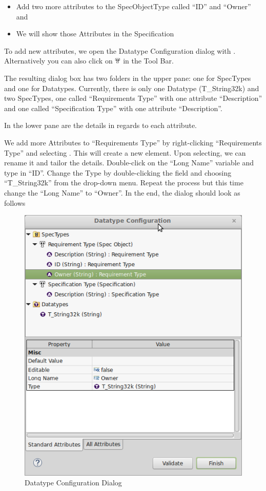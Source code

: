 \begin{itemize}
\item
  Add two more attributes to the SpecObjectType called ``ID'' and ``Owner'' and
\item
  We will show those Attributes in the Specification
\end{itemize}

To add new attributes, we open the Datatype Configuration dialog with .  Alternatively you can also click on \includegraphics[height=0.8em]{../rmf-images/icons/full/obj16/SpecType.png} in the Tool Bar.

The resulting dialog box has two folders in the upper pane: one for SpecTypes and one for Datatypes.  Currently, there is only one Datatype (T\_String32k) and two SpecTypes, one called ``Requirements Type'' with one attribute ``Description'' and one called ``Specification Type'' with one attribute ``Description''.

In the lower pane are the details in regards to each attribute.

We add more Attributes to ``Requirements Type'' by right-clicking ``Requirements Type'' and selecting .  This will create a new element.  Upon selecting, we can rename it and tailor the details.  Double-click on the ``Long Name'' variable and type in ``ID''.  Change the Type by double-clicking the field and choosing ``T\_String32k'' from the drop-down menu.  Repeat the process but this time change the ``Long Name'' to ``Owner''.  In the end, the dialog should look as follows

\begin{figure}[H]
\centering
\includegraphics[width=0.8\linewidth]{../rmf-images/datatype.png}
\caption{Datatype Configuration Dialog}
\label{fig:datatype_configuration}
\end{figure}

